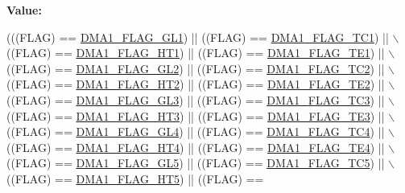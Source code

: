{\bfseries Value\+:}
\begin{DoxyCode}
(((FLAG) == \hyperlink{group___d_m_a__flags__definition_gad1ac00f031065682ac125f6f9be061e6}{DMA1\_FLAG\_GL1}) || ((FLAG) == \hyperlink{group___d_m_a__flags__definition_gaa9b4d1112bcfd34136007b813a11187e}{DMA1\_FLAG\_TC1}) || \(\backslash\)
                               ((FLAG) == \hyperlink{group___d_m_a__flags__definition_ga9c806b96cfdcebddb64f70d13ad32270}{DMA1\_FLAG\_HT1}) || ((FLAG) == 
      \hyperlink{group___d_m_a__flags__definition_gae30157801ac1460dab86a8f54cfd3479}{DMA1\_FLAG\_TE1}) || \(\backslash\)
                               ((FLAG) == \hyperlink{group___d_m_a__flags__definition_gad27b8a0cf554638d78fb67a010c0419b}{DMA1\_FLAG\_GL2}) || ((FLAG) == 
      \hyperlink{group___d_m_a__flags__definition_ga0eff24f7e6b2b874328d531ee9315b20}{DMA1\_FLAG\_TC2}) || \(\backslash\)
                               ((FLAG) == \hyperlink{group___d_m_a__flags__definition_gae154ffd90ebaec11f9ed1be00e69f149}{DMA1\_FLAG\_HT2}) || ((FLAG) == 
      \hyperlink{group___d_m_a__flags__definition_ga23bfb917d32a8dd5a96d343ef5f6ea46}{DMA1\_FLAG\_TE2}) || \(\backslash\)
                               ((FLAG) == \hyperlink{group___d_m_a__flags__definition_gaf3eccffb15e5b64611774b22f8b43e91}{DMA1\_FLAG\_GL3}) || ((FLAG) == 
      \hyperlink{group___d_m_a__flags__definition_ga0490d6c6fca12f4bcc61ef69e3fbdd93}{DMA1\_FLAG\_TC3}) || \(\backslash\)
                               ((FLAG) == \hyperlink{group___d_m_a__flags__definition_ga9c801c1702fcc41b74bb7397ce80a8fc}{DMA1\_FLAG\_HT3}) || ((FLAG) == 
      \hyperlink{group___d_m_a__flags__definition_gaa0b3d86f09829d0388273f0cd51698cc}{DMA1\_FLAG\_TE3}) || \(\backslash\)
                               ((FLAG) == \hyperlink{group___d_m_a__flags__definition_gace751c9c8aa57b154d61865625cca25b}{DMA1\_FLAG\_GL4}) || ((FLAG) == 
      \hyperlink{group___d_m_a__flags__definition_ga78f2798eca161493d5dc6058f65b0f17}{DMA1\_FLAG\_TC4}) || \(\backslash\)
                               ((FLAG) == \hyperlink{group___d_m_a__flags__definition_ga12ad5a2c8cd9778fecf88d1dab7626d4}{DMA1\_FLAG\_HT4}) || ((FLAG) == 
      \hyperlink{group___d_m_a__flags__definition_ga53beafec27ed89735e83fc7577a00d39}{DMA1\_FLAG\_TE4}) || \(\backslash\)
                               ((FLAG) == \hyperlink{group___d_m_a__flags__definition_ga173d8dadcbf3d96911a43eedf53bd64e}{DMA1\_FLAG\_GL5}) || ((FLAG) == 
      \hyperlink{group___d_m_a__flags__definition_ga438d3577b5b5b6c2c0cf1008296c23bb}{DMA1\_FLAG\_TC5}) || \(\backslash\)
                               ((FLAG) == \hyperlink{group___d_m_a__flags__definition_ga648a2eb0b008ab009f03d207596c3cd7}{DMA1\_FLAG\_HT5}) || ((FLAG) == 

\end{DoxyCode}
